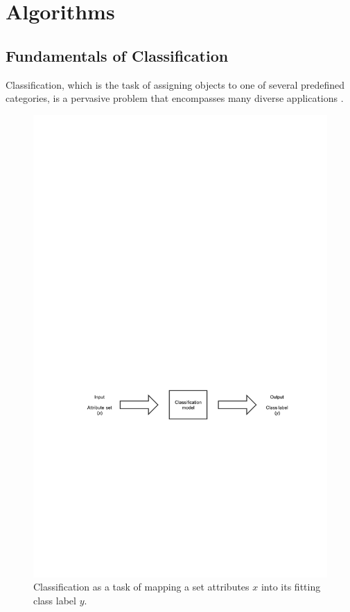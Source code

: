 
\chapter{Algorithms}
\label{ch:algorithms}

\section{Fundamentals of Classification}

Classification, which is the task of assigning objects to one of several predefined categories, is a pervasive problem that encompasses many diverse applications \cite{pang2006introduction}.

\begin{figure}[!htp]
  \center
  \includegraphics[width=\textwidth]{figures/classification}
  \caption{Classification as a task of mapping a set attributes $x$ into its fitting class label $y$.}
  \label{fig:classification_task}
\end{figure}

